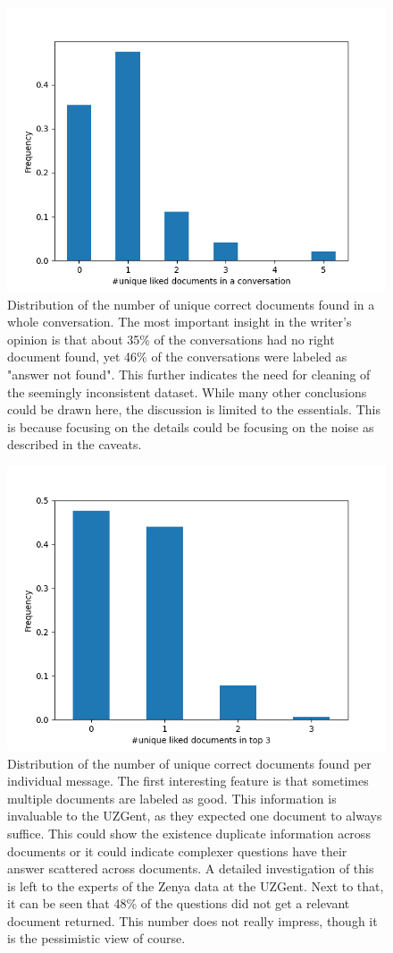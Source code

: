 \begin{figure}[H]
    \captionsetup{justification=centering}
    \centerline{\includegraphics[width=0.7\linewidth]{fig/RAG_nr_correct_in_conversation.png}}
    \caption{Distribution of the number of unique correct documents found in a whole conversation. The most important insight in the writer's opinion is that about 35\% of the conversations had no right document found, yet 46\% of the conversations were labeled as "answer not found". This further indicates the need for cleaning of the seemingly inconsistent dataset. While many other conclusions could be drawn here, the discussion is limited to the essentials. This is because focusing on the details could be focusing on the noise as described in the caveats.}
    \label{fig:liked_docs_per_convo}
\end{figure}

\begin{figure}[H]
    \captionsetup{justification=centering}
    \centerline{\includegraphics[width=0.7\linewidth]{fig/RAG_nr_top_3.png}}
    \caption{Distribution of the number of unique correct documents found per individual message. The first interesting feature is that sometimes multiple documents are labeled as good. This information is invaluable to the UZGent, as they expected one document to always suffice. This could show the existence duplicate information across documents or it could indicate complexer questions have their answer scattered across documents. A detailed investigation of this is left to the experts of the Zenya data at the UZGent. Next to that, it can be seen that 48\% of the questions did not get a relevant document returned. This number does not really impress, though it is the pessimistic view of course.}
    \label{fig:liked_docs}
\end{figure}

